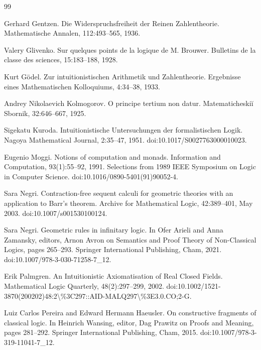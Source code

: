 \documentclass[10pt,a4paper]{article}
\begin{document}
\begin{thebibliography}{99}
\par\noindent    Gerhard Gentzen.  Die Widerspruchsfreiheit der Reinen Zahlentheorie.  Mathematische Annalen, 112:493–565, 1936.  

\par\noindent    Valery Glivenko.  Sur quelques points de la logique de M. Brouwer.  Bulletins de la classe des sciences, 15:183–188, 1928.  

\par\noindent    Kurt Gödel.  Zur intuitionistischen Arithmetik und Zahlentheorie.  Ergebnisse eines Mathematischen Kolloquiums, 4:34–38, 1933.  

\par\noindent    Andrey Nikolaevich Kolmogorov.  O principe tertium non datur.  Matematicheskiĭ Sbornik, 32:646–667, 1925.  

\par\noindent    Sigekatu Kuroda.  Intuitionistische Untersuchungen der formalistischen Logik.  Nagoya Mathematical Journal, 2:35–47, 1951.  doi:10.1017/S0027763000010023.  

\par\noindent    Eugenio Moggi.  Notions of computation and monads.  Information and Computation, 93(1):55–92, 1991.  Selections from 1989 IEEE Symposium on Logic in Computer Science.  doi:10.1016/0890-5401(91)90052-4.  

\par\noindent    Sara Negri.  Contraction-free sequent calculi for geometric theories with an application to Barr’s theorem.  Archive for Mathematical Logic, 42:389–401, May 2003.  doi:10.1007/s001530100124.  

\par\noindent    Sara Negri.  Geometric rules in infinitary logic.  In Ofer Arieli and Anna Zamansky, editors, Arnon Avron on Semantics and Proof Theory of Non-Classical Logics, pages 265–293. Springer International Publishing, Cham, 2021.  doi:10.1007/978-3-030-71258-7\_12.  

\par\noindent    Erik Palmgren.  An Intuitionistic Axiomatisation of Real Closed Fields.  Mathematical Logic Quarterly, 48(2):297–299, 2002.  doi:10.1002/1521-3870(200202)48:2\textbackslash{}\%3C297::AID-MALQ297\textbackslash{}\%3E3.0.CO;2-G.  

\par\noindent    Luiz Carlos Pereira and Edward Hermann Haeusler.  On constructive fragments of classical logic.  In Heinrich Wansing, editor, Dag Prawitz on Proofs and Meaning, pages 281–292. Springer International Publishing, Cham, 2015.  doi:10.1007/978-3-319-11041-7\_12.  


\end{thebibliography}
\end{document}

